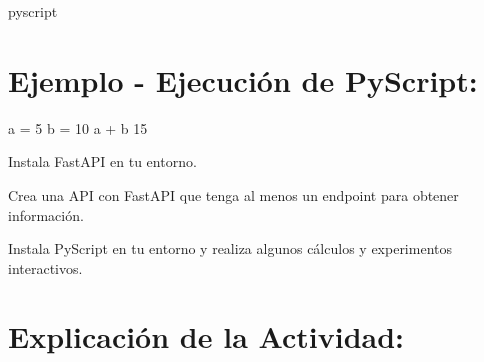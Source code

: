 \documentclass[
  a4paper,
  onepage,
  openany]{scrreprt}
\newenvironment{Shaded}{\begin{snugshade}}{\end{snugshade}}
\newcommand{\DecValTok}[1]{\textcolor[rgb]{0.68,0.00,0.00}{#1}}
\newcommand{\ExtensionTok}[1]{\textcolor[rgb]{0.00,0.23,0.31}{#1}}
\newcommand{\NormalTok}[1]{\textcolor[rgb]{0.00,0.23,0.31}{#1}}
\newcommand{\OperatorTok}[1]{\textcolor[rgb]{0.37,0.37,0.37}{#1}}
\begin{document}
\begin{Shaded}
\begin{Highlighting}[]
\ExtensionTok{pyscript}
\end{Highlighting}
\end{Shaded}

\hypertarget{ejemplo---ejecuciuxf3n-de-pyscript-1}{%
\section{Ejemplo - Ejecución de
PyScript:}\label{ejemplo---ejecuciuxf3n-de-pyscript-1}}

\begin{Shaded}
\begin{Highlighting}[]
\NormalTok{a }\OperatorTok{=} \DecValTok{5}
\NormalTok{b }\OperatorTok{=} \DecValTok{10}
\NormalTok{a }\OperatorTok{+}\NormalTok{ b}
\DecValTok{15}
\end{Highlighting}
\end{Shaded}

\begin{tcolorbox}[enhanced jigsaw, breakable, opacityback=0, toptitle=1mm, coltitle=black, toprule=.15mm, rightrule=.15mm, colframe=quarto-callout-important-color-frame, opacitybacktitle=0.6, arc=.35mm, title=\textcolor{quarto-callout-important-color}{\faExclamation}\hspace{0.5em}{Actividad Práctica:}, titlerule=0mm, colbacktitle=quarto-callout-important-color!10!white, bottomtitle=1mm, bottomrule=.15mm, colback=white, left=2mm, leftrule=.75mm]

Instala FastAPI en tu entorno.

Crea una API con FastAPI que tenga al menos un endpoint para obtener
información.

Instala PyScript en tu entorno y realiza algunos cálculos y experimentos
interactivos.

\end{tcolorbox}

\hypertarget{explicaciuxf3n-de-la-actividad-83}{%
\section{Explicación de la
Actividad:}\label{explicaciuxf3n-de-la-actividad-83}}
\end{document}
